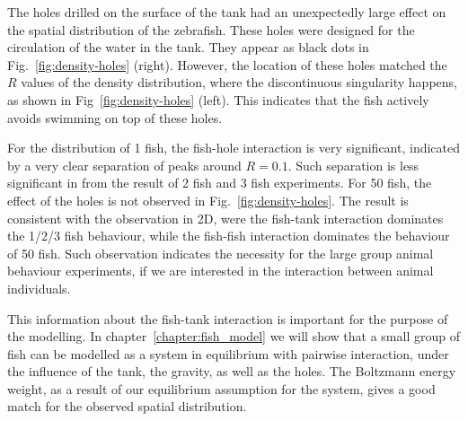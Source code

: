 \documentclass[11pt,twoside]{report}
\begin{document}

The holes drilled on the surface of the tank had an unexpectedly large effect on the spatial distribution of the zebrafish. These holes were designed for the circulation of the water in the tank. They appear as black dots in Fig.~\ref{fig:density-holes} (right). However, the location of these holes matched the $R$ values of the density distribution, where the discontinuous singularity happens, as shown in Fig~\ref{fig:density-holes} (left). This indicates that the fish actively avoids swimming on top of these holes.

For the distribution of 1 fish, the fish-hole interaction is very significant, indicated by a very clear separation of peaks around $R=0.1$. Such separation is less significant in from the result of 2 fish and 3 fish experiments. For 50 fish, the effect of the holes is not observed in Fig.~\ref{fig:density-holes}. The result is consistent with the observation in 2D, were the fish-tank interaction dominates the 1/2/3 fish behaviour, while the fish-fish interaction dominates the behaviour of 50 fish. Such observation indicates the necessity for the large group animal behaviour experiments, if we are interested in the interaction between animal individuals.

This information about the fish-tank interaction is important for the purpose of the modelling. In chapter~\ref{chapter:fish_model} we will show that a small group of fish can be modelled as a system in equilibrium with pairwise interaction, under the influence of the tank, the gravity, as well as the holes. The Boltzmann energy weight, as a result of our equilibrium assumption for the system, gives a good match for the observed spatial distribution.
\end{document}
